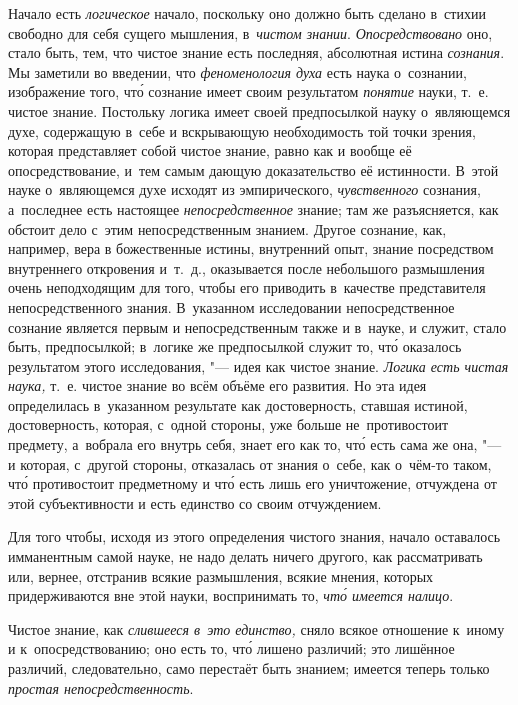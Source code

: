 Начало есть {\em логическое} начало, поскольку оно должно быть сделано в~стихии
свободно для себя сущего мышления, в~{\em чистом знании}. {\em Опосредствовано}
оно, стало быть, тем, что чистое знание есть последняя, абсолютная истина {\em
сознания}. Мы заметили во введении, что {\em феноменология духа} есть наука
о~сознании, изображение того, чт\'{о} сознание имеет своим результатом
{\em понятие} науки, т.~е. чистое знание. Постольку логика имеет своей
предпосылкой науку о~являющемся духе, содержащую в~себе и вскрывающую
необходимость той точки зрения, которая представляет собой чистое знание, равно
как и вообще её опосредствование, и~тем самым дающую доказательство её
истинности. В~этой науке о~являющемся духе исходят из эмпирического,
{\em чувственного} сознания, а~последнее есть настоящее {\em непосредственное}
знание; там же разъясняется, как обстоит дело с~этим непосредственным знанием.
Другое сознание, как, например, вера в божественные истины, внутренний опыт,
знание посредством внутреннего откровения и~т.~д., оказывается после небольшого
размышления очень неподходящим для того, чтобы его приводить в~качестве
представителя непосредственного знания. В~указанном исследовании
непосредственное сознание является первым и непосредственным также и в~науке, и
служит, стало быть, предпосылкой; в~логике же предпосылкой служит то, чт\'{о}
оказалось результатом этого исследования, "--- идея как чистое знание.
{\em Логика есть чистая наука,} т.~е. чистое знание во всём объёме его
развития. Но эта идея определилась в~указанном результате как достоверность,
ставшая истиной, достоверность, которая, с~одной стороны, уже больше
не~противостоит предмету, а~вобрала его внутрь себя, знает его как то, чт\'{о}
есть сама же она, "--- и которая, с~другой стороны, отказалась от знания о~себе, как
о~чём-то таком, чт\'{о} противостоит предметному и чт\'{о} есть лишь его
уничтожение, отчуждена от этой субъективности и есть единство
со своим отчуждением.

Для того чтобы, исходя из этого определения чистого знания, начало оставалось
имманентным самой науке, не надо делать ничего другого, как рассматривать или,
вернее, отстранив всякие размышления, всякие мнения, которых придерживаются
вне этой науки, воспринимать то, {\em чт\'{о} имеется налицо}.

Чистое знание, как {\em слившееся в~это единство,} сняло всякое отношение
к~иному и к~опосредствованию; оно есть то, чт\'{о} лишено различий; это
лишённое различий, следовательно, само перестаёт быть знанием; имеется теперь
только {\em простая непосредственность}.

